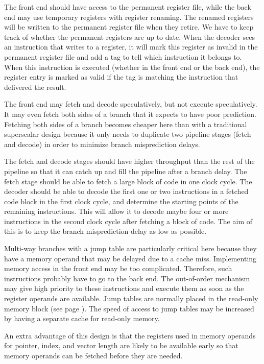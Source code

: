 \documentclass[forwardcom.tex]{subfiles}
\begin{document}
The front end should have access to the permanent register file, while the back end may use temporary registers with register renaming. The renamed registers will be written to the permanent register file when they retire. We have to keep track of whether the permanent registers are up to date. When the decoder sees an instruction that writes to a register, it will mark this register as invalid in the permanent register file and add a tag to tell which instruction it belongs to. When this instruction is executed (whether in the front end or the back end), the register entry is marked as valid if the tag is matching the instruction that delivered the result.
\vv

The front end may fetch and decode speculatively, but not execute speculatively. It may even fetch both sides of a branch that it expects to have poor prediction. Fetching both sides of a branch becomes cheaper here than with a traditional superscalar design because it only needs to duplicate two pipeline stages (fetch and decode) in order to minimize branch misprediction delays.
\vv

The fetch and decode stages should have higher throughput than the rest of the pipeline so that it can catch up and fill the pipeline after a branch delay. The fetch stage should be able to fetch a large block of code in one clock cycle. The decoder should be able to decode the first one or two instructions in a fetched code block in the first clock cycle, and determine the starting points of the remaining instructions. This will allow it to decode maybe four or more instructions in the second clock cycle after fetching a block of code. The aim of this is to keep the branch misprediction delay as low as possible. 
\vv

Multi-way branches with a jump table are particularly critical here because they have a memory operand that may be delayed due to a cache miss. Implementing memory access in the front end may be too complicated. Therefore, such instructions probably have to go to the back end. The out-of-order mechanism may give high priority to these instructions and execute them as soon as the register operands are available. Jump tables are normally placed in the read-only memory block (see page \pageref{memoryModel}). The speed of access to jump tables may be increased by having a separate cache for read-only memory.
\vv

An extra advantage of this design is that the registers used in memory operands for pointer, index, and vector length are likely to be available early so that memory operands can be fetched before they are needed.
\vv
\end{document}
